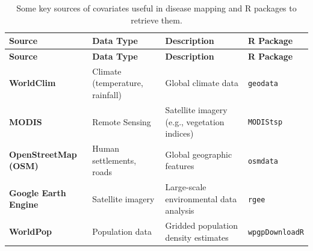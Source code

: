 \documentclass[
  letterpaper,
]{krantz}
\begin{document}
\begin{longtable}[]{@{}
  >{\raggedright\arraybackslash}p{}
  >{\raggedright\arraybackslash}p{}
  >{\raggedright\arraybackslash}p{}
  >{\raggedright\arraybackslash}p{}@{}}
\caption{Some key sources of covariates useful in disease mapping and R
packages to retrieve them.}\label{tbl-data-sources}\tabularnewline
\toprule\noalign{}
\begin{minipage}[b]{\linewidth}\raggedright
\textbf{Source}
\end{minipage} & \begin{minipage}[b]{\linewidth}\raggedright
\textbf{Data Type}
\end{minipage} & \begin{minipage}[b]{\linewidth}\raggedright
\textbf{Description}
\end{minipage} & \begin{minipage}[b]{\linewidth}\raggedright
\textbf{R Package}
\end{minipage} \\
\midrule\noalign{}
\endfirsthead
\toprule\noalign{}
\begin{minipage}[b]{\linewidth}\raggedright
\textbf{Source}
\end{minipage} & \begin{minipage}[b]{\linewidth}\raggedright
\textbf{Data Type}
\end{minipage} & \begin{minipage}[b]{\linewidth}\raggedright
\textbf{Description}
\end{minipage} & \begin{minipage}[b]{\linewidth}\raggedright
\textbf{R Package}
\end{minipage} \\
\midrule\noalign{}
\endhead
\bottomrule\noalign{}
\endlastfoot
\textbf{WorldClim} & Climate (temperature, rainfall) & Global climate
data & \texttt{geodata} \\
\textbf{MODIS} & Remote Sensing & Satellite imagery (e.g., vegetation
indices) & \texttt{MODIStsp} \\
\textbf{OpenStreetMap (OSM)} & Human settlements, roads & Global
geographic features & \texttt{osmdata} \\
\textbf{Google Earth Engine} & Satellite imagery & Large-scale
environmental data analysis & \texttt{rgee} \\
\textbf{WorldPop} & Population data & Gridded population density
estimates & \texttt{wpgpDownloadR} \\
\end{longtable}
\end{document}
